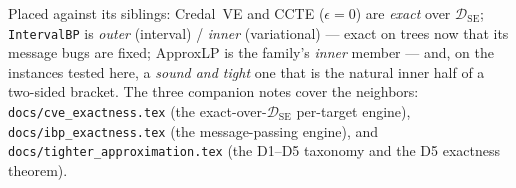 \documentclass[11pt]{article}
\newcommand{\DSE}{\mathcal{D}_{\mathrm{SE}}}
\begin{document}
\noindent Placed against its siblings: Credal~VE and CCTE ($\epsilon=0$) are \emph{exact} over
$\DSE$; \texttt{IntervalBP} is \emph{outer} (interval) / \emph{inner} (variational) --- exact on
trees now that its message bugs are fixed; ApproxLP is the family's \emph{inner} member --- and, on
the instances tested here, a \emph{sound and tight} one that is the natural inner half of a two-sided
bracket. The
three companion notes cover the neighbors: \texttt{docs/cve\_exactness.tex} (the exact-over-$\DSE$
per-target engine), \texttt{docs/ibp\_exactness.tex} (the message-passing engine), and
\texttt{docs/tighter\_approximation.tex} (the D1--D5 taxonomy and the D5 exactness theorem).
\end{document}

